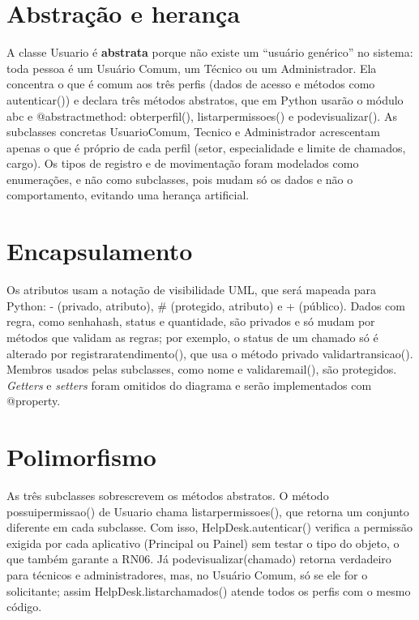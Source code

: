 \documentclass[12pt]{article}
\newcommand{\brk}{\textunderscore\allowbreak}
\newcommand{\cod}[1]{{\small\ttfamily\let\_\brk #1}}
\begin{document}
\section{Abstração e herança}

A classe \cod{Usuario} é \textbf{abstrata} porque não existe um ``usuário genérico'' no sistema: toda pessoa é um Usuário Comum, um Técnico ou um Administrador. Ela concentra o que é comum aos três perfis (dados de acesso e métodos como \cod{autenticar()}) e declara três métodos abstratos, que em Python usarão o módulo \cod{abc} e \cod{@abstractmethod}: \cod{obter\_perfil()}, \cod{listar\_permissoes()} e \cod{pode\_visualizar()}. As subclasses concretas \cod{UsuarioComum}, \cod{Tecnico} e \cod{Administrador} acrescentam apenas o que é próprio de cada perfil (setor, especialidade e limite de chamados, cargo). Os tipos de registro e de movimentação foram modelados como enumerações, e não como subclasses, pois mudam só os dados e não o comportamento, evitando uma herança artificial.

\section{Encapsulamento}

Os atributos usam a notação de visibilidade UML, que será mapeada para Python: \cod{-} (privado, \cod{\_\_atributo}), \cod{\#} (protegido, \cod{\_atributo}) e \cod{+} (público). Dados com regra, como \cod{senha\_hash}, \cod{status} e \cod{quantidade}, são privados e só mudam por métodos que validam as regras; por exemplo, o status de um chamado só é alterado por \cod{registrar\_atendimento()}, que usa o método privado \cod{validar\_transicao()}. Membros usados pelas subclasses, como \cod{nome} e \cod{validar\_email()}, são protegidos. \textit{Getters} e \textit{setters} foram omitidos do diagrama e serão implementados com \cod{@property}.

\section{Polimorfismo}

As três subclasses sobrescrevem os métodos abstratos. O método \cod{possui\_permissao()} de \cod{Usuario} chama \cod{listar\_permissoes()}, que retorna um conjunto diferente em cada subclasse. Com isso, \cod{HelpDesk.autenticar()} verifica a permissão exigida por cada aplicativo (Principal ou Painel) sem testar o tipo do objeto, o que também garante a RN06. Já \cod{pode\_visualizar(chamado)} retorna verdadeiro para técnicos e administradores, mas, no Usuário Comum, só se ele for o solicitante; assim \cod{HelpDesk.listar\_chamados()} atende todos os perfis com o mesmo código.
\end{document}
